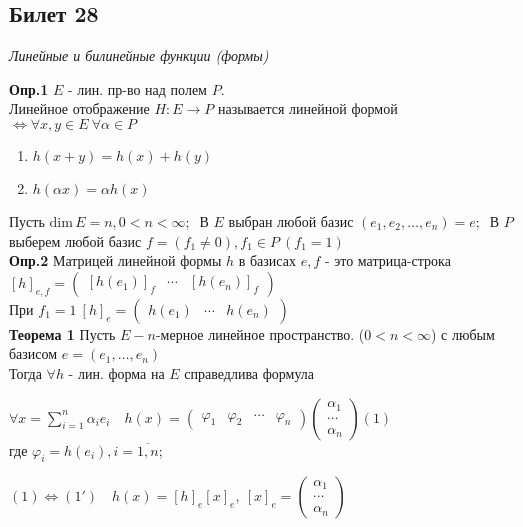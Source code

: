 \subsection{Билет 28}

\textit{Линейные и билинейные функции (формы)}

\textbf{Опр.1} $E$ - лин. пр-во над полем $P$. \\
Линейное отображение $H : E \to P$ называется линейной формой $\Leftrightarrow \forall x,y \in E\ \forall \alpha \in P\ $
\begin{enumerate}
 \item $h(x+y) = h(x) + h(y)$
 \item $h(\alpha x) = \alpha h(x)$
\end{enumerate}

Пусть $\mathrm{dim}\, E = n, 0 < n < \infty;\ $ В $E$ выбран любой базис $(e_1, e_2,\ldots, e_n) = e;\ $ В $P$ выберем любой базис $f = (f_1 \ne 0), f_1 \in P\ (f_1 = 1)$\\

\textbf{Опр.2} Матрицей линейной формы $h$  в базисах $e,f$ - это матрица-строка $[h]_{e,f} = \begin{pmatrix} [h(e_1)]_f & \cdots & [h(e_n)]_f  \end{pmatrix}$\\
При $f_1=1\ [h]_e = \begin{pmatrix} h(e_1) & \cdots & h(e_n) \end{pmatrix}$\\

\textbf{Теорема 1} Пусть $E - n$-мерное линейное пространство. ($0 < n < \infty$) с любым базисом $e=(e_1, \ldots, e_n)$\\
Тогда $\forall h$ - лин. форма на $E$ справедлива формула
 
$\forall x = \sum\limits_{i=1}^n \alpha_i e_i\quad h(x) = \begin{pmatrix} \varphi_1 & \varphi_2 & \cdots & \varphi_n \end{pmatrix} \begin{pmatrix} \alpha_1 \\ \cdots \\ \alpha_n \end{pmatrix} (1)$\\
где $\varphi_i = h(e_i), i = \overline{1,n}$; 

$(1) \Leftrightarrow (1') \quad h(x) = [h]_e [x]_e,\ [x]_e = \begin{pmatrix} \alpha_1  \\ \cdots \\ \alpha_n \end{pmatrix}$

